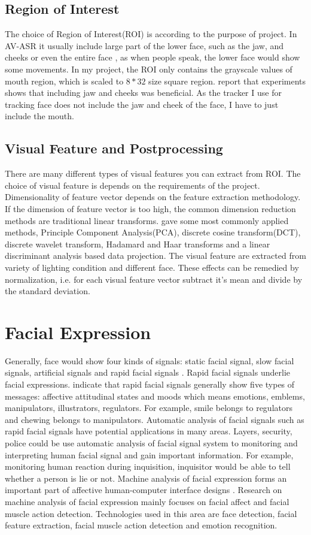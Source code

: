 \subsection{Region of Interest}
The choice of Region of Interest(ROI) is according to the purpose of project. In AV-ASR it usually include large part of the lower face, such as the jaw, and cheeks or even the entire face \cite{potamianos2003recent}, as when people speak, the lower face would show some movements. In my project, the ROI only contains the grayscale values of mouth region, which is scaled to $8 * 32$ size square region. \cite{potamianos2003recent} report that experiments shows that including jaw and cheeks was beneficial. As the tracker I use for tracking face does not include the jaw and cheek of the face, I have to just include the mouth.
\subsection{Visual Feature and Postprocessing}
There are many different types of visual features you can extract from ROI. The choice of visual feature is depends on the requirements of the project. Dimensionality of feature vector depends on the feature extraction methodology. If the dimension of feature vector is too high, the common dimension reduction methods are traditional linear transforms. \cite{potamianos2003recent} gave some most commonly applied methods, Principle Component Analysis(PCA), discrete cosine transform(DCT), discrete wavelet transform, Hadamard and Haar transforms and a linear discriminant analysis based data projection. The visual feature are extracted from variety of lighting condition and different face. These effects can be remedied by normalization, i.e. for each visual feature vector subtract it's mean and divide by the standard deviation.
\section{Facial Expression}
Generally, face would show four kinds of signals: static facial signal, slow facial signals, artificial signals and rapid facial signals \cite{pantic2007machine}. Rapid facial signals underlie facial expressions. \cite{pantic2007machine} indicate that rapid facial signals generally show five types of messages: affective attitudinal states and moods which means emotions, emblems, manipulators, illustrators, regulators. For example, smile belongs to regulators and chewing belongs to manipulators. Automatic analysis of facial signals such as rapid facial signals have potential applications in many areas. Layers, security, police could be use automatic analysis of facial signal system to monitoring and interpreting human facial signal and gain important information. For example, monitoring human reaction during inquisition, inquisitor would be able to tell whether a person is lie or not.  Machine analysis of facial expression forms an important part of affective human-computer interface designs \cite{pantic2007machine}.  Research on machine analysis of facial expression mainly focuses on facial affect and facial muscle action detection\cite{pantic2007machine}. Technologies used in this area are face detection, facial feature extraction, facial muscle action detection and emotion recognition\cite{pantic2007machine}.
